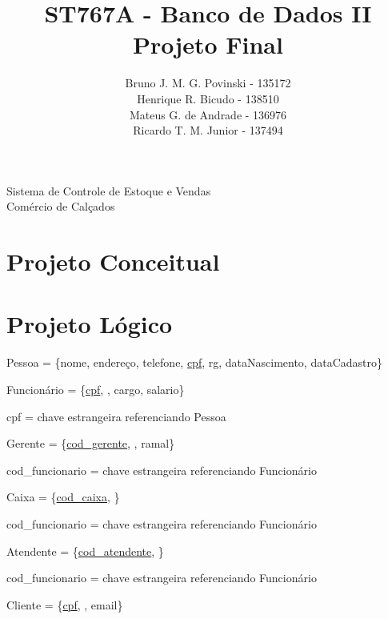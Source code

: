 \documentclass[a4paper,12pt]{article}
\title{ST767A - Banco de Dados II \\ Projeto Final}
\author{Bruno J. M. G. Povinski - 135172 \\ Henrique R. Bicudo - 138510 \\ Mateus G. de Andrade - 136976 \\ Ricardo T. M. Junior - 137494}
\date{}
\begin{document}
	\maketitle
	
	\begin{center}
		\begin{Large}
			Sistema de Controle de Estoque e Vendas \\ Comércio de Calçados
		\end{Large}
	\end{center}
	
	\section{Projeto Conceitual}
	\section{Projeto Lógico}
	\begin{flushleft}
		Pessoa = \{nome, endereço, telefone, \uline{cpf}, rg, dataNascimento, dataCadastro\}
	\end{flushleft}
	\begin{flushleft}
		Funcionário = \{\uline{cpf}, , cargo, salario\}
	\end{flushleft}
	
	cpf = chave estrangeira referenciando Pessoa
	
	\begin{flushleft}
		Gerente = \{\uline{cod\_gerente}, , ramal\}
	\end{flushleft}
	
	cod\_funcionario = chave estrangeira referenciando Funcionário
	
	\begin{flushleft}
		Caixa = \{\uline{cod\_caixa}, \uuline{cod\_funcionario}\}
	\end{flushleft}
	
	cod\_funcionario = chave estrangeira referenciando Funcionário
	
	\begin{flushleft}
		Atendente = \{\uline{cod\_atendente}, \}
	\end{flushleft}
	
	cod\_funcionario = chave estrangeira referenciando Funcionário
	
	\begin{flushleft}
		Cliente = \{\uline{cpf}, , email\}
	\end{flushleft}
	
\end{document}
